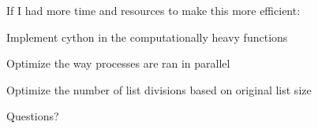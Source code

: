 \documentclass{beamer}
\begin{document}
\begin{frame}
If I had more time and resources to make this more efficient:

\textbullet Implement cython in the computationally heavy functions

\textbullet Optimize the way processes are ran in parallel

\textbullet Optimize the number of list divisions based on original list size
\end{frame}


\begin{frame}
Questions?
\end{frame}
\end{document}
